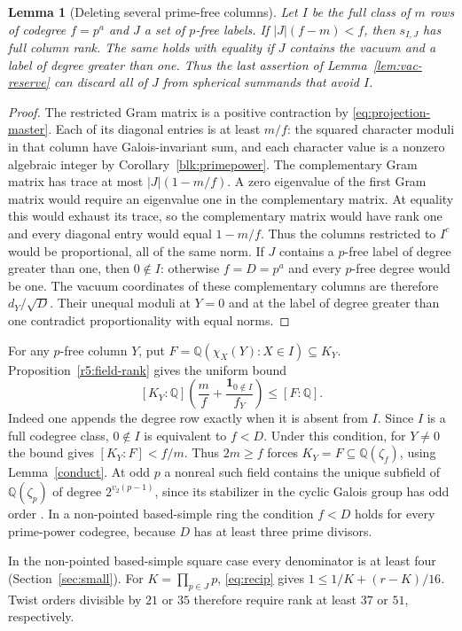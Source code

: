 \documentclass[11pt]{amsart}
\numberwithin{equation}{section}
\newtheorem{lemma}[theorem]{Lemma}
\theoremstyle{definition}
\theoremstyle{plain}
\newcommand{\QQ}{\mathbb Q}
\begin{document}
\begin{lemma}[Deleting several prime-free columns]\label{new:many-reserve}
Let $I$ be the full class of $m$ rows of codegree $f=p^a$ and $J$ a
set of $p$-free labels. If $|J|(f-m)<f$, then $s_{I,J}$ has full
column rank. The same holds with equality if $J$ contains the vacuum
and a label of degree greater than one. Thus the last assertion of
Lemma~\ref{lem:vac-reserve}
can discard all of $J$ from spherical summands that avoid $I$.
\end{lemma}
\begin{proof}
The restricted Gram matrix is a positive contraction by
\eqref{eq:projection-master}. Each of its diagonal entries is at least $m/f$: the
squared character moduli in that column have Galois-invariant sum,
and each character value is a nonzero algebraic integer by
Corollary~\ref{blk:primepower}. The complementary Gram matrix has
trace at most $|J|(1-m/f)$. A zero eigenvalue of the first Gram
matrix would require an eigenvalue one in the complementary matrix.
At equality this would exhaust its trace, so the complementary
matrix would have rank one and every diagonal entry would equal
$1-m/f$. Thus the columns restricted to $I^c$ would be proportional,
all of the same norm. If $J$ contains a $p$-free label of degree
greater than one, then $0\notin I$: otherwise $f=D=p^a$ and every
$p$-free degree would be one. The vacuum coordinates of these
complementary columns are therefore $d_Y/\sqrt D$. Their unequal
moduli at $Y=0$ and at the label of degree greater than one contradict
proportionality with equal norms.
\end{proof}

For any $p$-free column $Y$, put
$F=\QQ(\chi_X(Y):X\in I)\subseteq K_Y$.
Proposition~\ref{r5:field-rank} gives the uniform bound
\[
 [K_Y:\QQ]\left(\frac mf+
       \frac{\mathbf1_{0\notin I}}{f_Y}\right)
       \le [F:\QQ].
\]
Indeed one appends the degree row exactly when it is absent from
$I$. Since $I$ is a full codegree class, $0\notin I$ is equivalent
to $f<D$. Under this condition, for $Y\ne0$ the bound gives
$[K_Y:F]<f/m$. Thus $2m\ge f$ forces
$K_Y=F\subseteq\QQ(\zeta_f)$, using Lemma~\ref{conduct}.
At odd $p$ a nonreal such field contains the unique subfield of
$\QQ(\zeta_p)$ of degree $2^{v_2(p-1)}$, since its stabilizer
in the cyclic Galois group has odd order \cite[Ch.~6]{Washington}.
In a non-pointed based-simple ring the condition $f<D$ holds for
every prime-power codegree, because $D$ has at least three prime
divisors.

In the non-pointed based-simple square case every denominator is at
least four (Section~\ref{sec:small}). For $K=\prod_{p\in J}p$,
\eqref{eq:recip} gives $1\le1/K+(r-K)/16$. Twist orders divisible by
$21$ or $35$ therefore require rank at least $37$ or $51$, respectively.
\end{document}
